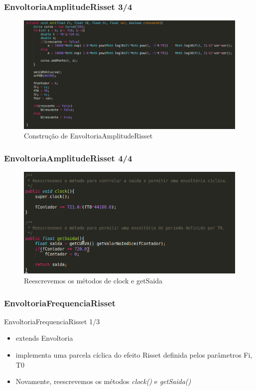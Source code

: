 \documentclass{beamer}
\begin{document}
\begin{frame}
 \frametitle{EnvoltoriaAmplitudeRisset 3/4}
 \begin{figure}
  \includegraphics[scale=0.4]{./images/ampRisset_code.png}
  \caption{Construção de EnvoltoriaAmplitudeRisset}
   \end{figure}
\end{frame}

\begin{frame}
 \frametitle{EnvoltoriaAmplitudeRisset 4/4}
 \begin{figure}
  \includegraphics[scale=0.4]{./images/ampRisset_detalhe.png}
  \caption{Reescrevemos os métodos de clock e getSaida}
   \end{figure}
\end{frame}

\subsubsection{EnvoltoriaFrequenciaRisset}
\begin{frame}{EnvoltoriaFrequenciaRisset 1/3}
\begin{itemize}
	\item extends Envoltoria
	\item implementa uma parcela cíclica do efeito Risset definida pelos parâmetros
	 Fi, T0
	 \item Novamente, reescrevemos os métodos \emph{clock()} e \emph{getSaida()}
\end{itemize}

\end{frame}
\end{document}
